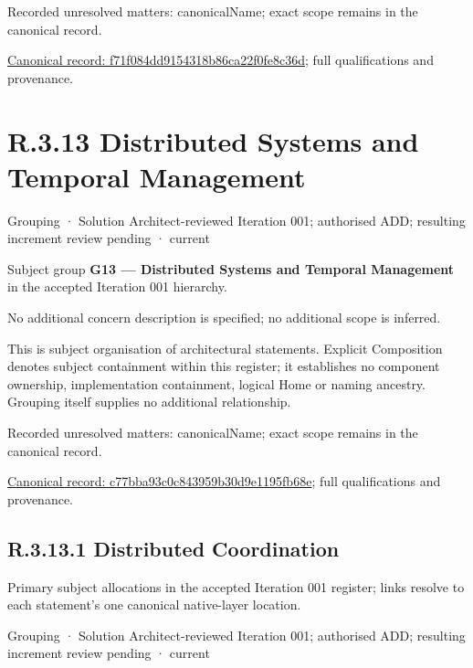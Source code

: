 {\small Recorded unresolved matters: canonicalName; exact scope remains in the canonical record.}\par
{\footnotesize \href{../../../../continuum/grouping/f71f084dd9154318b86ca22f0fe8c36d.md}{Canonical record: f71f084dd9154318b86ca22f0fe8c36d}; full qualifications and provenance.}\par
\section*{R.3.13 Distributed Systems and Temporal Management}
\label{navigation:R.3.13}

\label{element:c77bba93c0c843959b30d9e1195fb68e}
{\small Grouping · Solution Architect-reviewed Iteration 001; authorised ADD; resulting increment review pending · current}\par

Subject group \textbf{G13 — Distributed Systems and Temporal Management} in the accepted Iteration 001 hierarchy.



No additional concern description is specified; no additional scope is inferred.



This is subject organisation of architectural statements. Explicit Composition denotes subject containment within this register; it establishes no component ownership, implementation containment, logical Home or naming ancestry. Grouping itself supplies no additional relationship.


{\small Recorded unresolved matters: canonicalName; exact scope remains in the canonical record.}\par
{\footnotesize \href{../../../../continuum/grouping/c77bba93c0c843959b30d9e1195fb68e.md}{Canonical record: c77bba93c0c843959b30d9e1195fb68e}; full qualifications and provenance.}\par
\subsection*{R.3.13.1 Distributed Coordination}
\label{navigation:R.3.13.1}

Primary subject allocations in the accepted Iteration 001 register; links resolve to each statement’s one canonical native-layer location.\par
\label{element:114a3866dffc4a4cb6aabef39b48fadf}
{\small Grouping · Solution Architect-reviewed Iteration 001; authorised ADD; resulting increment review pending · current}\par


